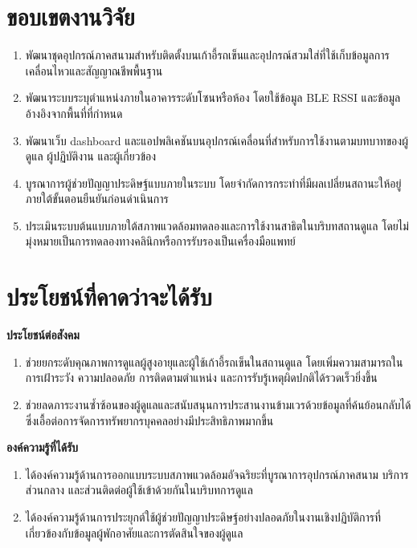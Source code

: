 \section{ขอบเขตงานวิจัย}
\label{sec:ch1_scope}

\begin{enumerate}
    \item พัฒนาชุดอุปกรณ์ภาคสนามสำหรับติดตั้งบนเก้าอี้รถเข็นและอุปกรณ์สวมใส่ที่ใช้เก็บข้อมูลการเคลื่อนไหวและสัญญาณชีพพื้นฐาน
    \item พัฒนาระบบระบุตำแหน่งภายในอาคารระดับโซนหรือห้อง โดยใช้ข้อมูล BLE RSSI และข้อมูลอ้างอิงจากพื้นที่ที่กำหนด
    \item พัฒนาเว็บ dashboard และแอปพลิเคชันบนอุปกรณ์เคลื่อนที่สำหรับการใช้งานตามบทบาทของผู้ดูแล ผู้ปฏิบัติงาน และผู้เกี่ยวข้อง
    \item บูรณาการผู้ช่วยปัญญาประดิษฐ์แบบภายในระบบ โดยจำกัดการกระทำที่มีผลเปลี่ยนสถานะให้อยู่ภายใต้ขั้นตอนยืนยันก่อนดำเนินการ
    \item ประเมินระบบต้นแบบภายใต้สภาพแวดล้อมทดลองและการใช้งานสาธิตในบริบทสถานดูแล โดยไม่มุ่งหมายเป็นการทดลองทางคลินิกหรือการรับรองเป็นเครื่องมือแพทย์
\end{enumerate}

\section{ประโยชน์ที่คาดว่าจะได้รับ}
\label{sec:ch1_benefits}

\textbf{ประโยชน์ต่อสังคม}
\begin{enumerate}
    \item ช่วยยกระดับคุณภาพการดูแลผู้สูงอายุและผู้ใช้เก้าอี้รถเข็นในสถานดูแล โดยเพิ่มความสามารถในการเฝ้าระวัง ความปลอดภัย การติดตามตำแหน่ง และการรับรู้เหตุผิดปกติได้รวดเร็วยิ่งขึ้น
    \item ช่วยลดภาระงานซ้ำซ้อนของผู้ดูแลและสนับสนุนการประสานงานข้ามเวรด้วยข้อมูลที่ค้นย้อนกลับได้ ซึ่งเอื้อต่อการจัดการทรัพยากรบุคคลอย่างมีประสิทธิภาพมากขึ้น
\end{enumerate}

\textbf{องค์ความรู้ที่ได้รับ}
\begin{enumerate}
    \item ได้องค์ความรู้ด้านการออกแบบระบบสภาพแวดล้อมอัจฉริยะที่บูรณาการอุปกรณ์ภาคสนาม บริการส่วนกลาง และส่วนติดต่อผู้ใช้เข้าด้วยกันในบริบทการดูแล
    \item ได้องค์ความรู้ด้านการประยุกต์ใช้ผู้ช่วยปัญญาประดิษฐ์อย่างปลอดภัยในงานเชิงปฏิบัติการที่เกี่ยวข้องกับข้อมูลผู้พักอาศัยและการตัดสินใจของผู้ดูแล
\end{enumerate}

